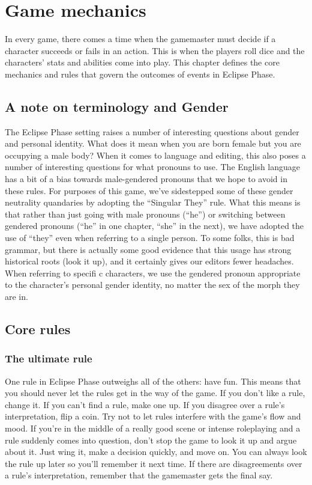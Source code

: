 \chapter{Game mechanics}
\label{chap:game-mechanics}

In every game, there comes a time when the gamemaster must decide if a character succeeds or fails in an action. This is when the players roll dice and the characters' stats and abilities come into play. This chapter defines the core mechanics and rules that govern the outcomes of events in Eclipse Phase.

\section{A note on terminology and Gender}
The Eclipse Phase setting raises a number of interesting questions about gender and personal identity. What does it mean when you are born female but you are occupying a male body? When it comes to language and editing, this also poses a number of interesting questions for what pronouns to use. The English language has a bit of a bias towards male-gendered pronouns that we hope to avoid in these rules. For purposes of this game, we’ve sidestepped some of these gender neutrality quandaries by adopting the “Singular They” rule. What this means is that rather than just going with male pronouns (“he”) or switching between gendered pronouns (“he” in one chapter, “she” in the next), we have adopted the use of “they” even when referring to a single person. To some folks, this is bad grammar, but there is actually some good evidence that this usage has strong historical roots (look it up), and it certainly gives our editors fewer headaches. When referring to specifi c characters, we use the gendered pronoun appropriate to the character’s personal gender identity, no matter the sex of the morph they are in.


\section{Core rules}
\label{sec:basics}

\subsection{The ultimate rule}
\label{sec:ultimate-rule}

One rule in Eclipse Phase outweighs all of the others: have fun. This means that you should never let the rules get in the way of the game. If you don't like a rule, change it. If you can't find a rule, make one up. If you disagree over a rule's interpretation, flip a coin. Try not to let rules interfere with the game's flow and mood. If you're in the middle of a really good scene or intense roleplaying and a rule suddenly comes into question, don't stop the game to look it up and argue about it. Just wing it, make a decision quickly, and move on. You can always look the rule up later so you'll remember it next time. If there are disagreements over a rule's interpretation, remember that the gamemaster gets the final say.

